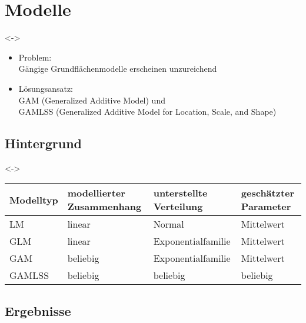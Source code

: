 \section{Modelle}

\begin{frame}[c]
  \visible<\theFirstElement->{
    \begin{itemize}
    \item Problem: \\
      Gängige Grundflächenmodelle erscheinen unzureichend
      
    \item Lösungsansatz: \\
      GAM (Generalized Additive Model) und \\
      GAMLSS (Generalized Additive Model for Location, Scale, and Shape)
    \end{itemize}}
\end{frame}

\subsection{Hintergrund}

\begin{frame}[c]
  \visible<\theFirstElement->{
    {\scriptsize
      \begin{tabular}{l l l l}
      \toprule
      Modelltyp & modellierter Zusammenhang & unterstellte Verteilung & geschätzter Parameter \\
      \midrule
      LM & linear & Normal & Mittelwert \\
      GLM & linear & Exponentialfamilie & Mittelwert \\
      GAM & beliebig & Exponentialfamilie & Mittelwert \\
      GAMLSS & beliebig & beliebig & beliebig \\
      \bottomrule
    \end{tabular}}
  }
\end{frame}

\subsection{Ergebnisse}

\begin{frame}[c]
\end{frame}

